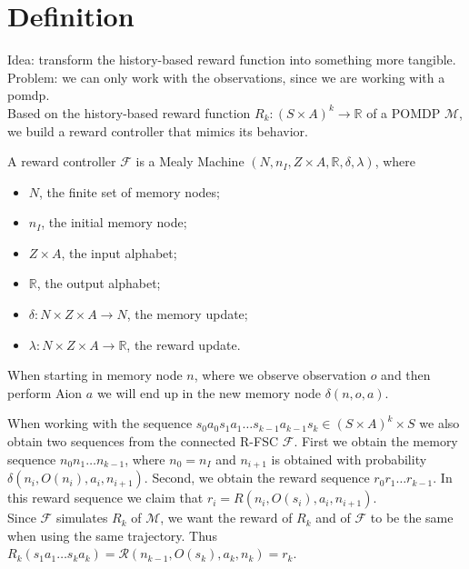 \section{Definition}
Idea: transform the history-based reward function into something more tangible. Problem: we can only work with the observations, since we are working with a pomdp.\\


Based on the history-based reward function $R_k:(S\times A)^k\to\mathbb{R}$ of a POMDP $\mathcal{M}$, we build a reward controller that mimics its behavior.


\begin{definition}
	A reward controller $\mathcal{F}$ is a Mealy Machine $(N,n_I, Z\times A, \mathbb{R}, \delta, \lambda)$, where
	\begin{itemize}
		\item $N$, the finite set of memory nodes;
		\item $n_I$, the initial memory node;
		\item $Z\times A$, the input alphabet;
		\item $\mathbb{R}$, the output alphabet;
		\item $\delta: N \times Z \times A \to N$, the memory update;
		\item $\lambda: N \times Z \times A \to \mathbb{R}$, the reward update. 
	\end{itemize}
\end{definition}


When starting in memory node $n$, where we observe observation $o$ and then perform Aion $a$ we will end up in the new memory node $\delta(n,o,a)$.

When working with the sequence $s_0 a_0 s_1 a_1 \dots s_{k-1} a_{k-1} s_k\in(S\times A)^k\times S$ we also obtain two sequences from the connected R-FSC $\mathcal{F}$. First we obtain the memory sequence $n_0 n_1 \dots n_{k-1}$, where $n_0=n_I$ and $n_{i+1}$ is obtained with probability $\delta(n_i,O(n_i),a_i,n_{i+1})$. Second, we obtain the reward sequence $r_0 r_1 \dots r_{k-1}$. In this reward sequence we claim that $r_i=R(n_i,O(s_i),a_i,n_{i+1})$. \\

Since $\mathcal{F}$ simulates $R_k$ of $\mathcal{M}$, we want the reward of $R_k$ and of $\mathcal{F}$ to be the same when using the same trajectory. Thus $R_k(s_1 a_1 \dots s_{k} a_{k}) = \mathcal{R}(n_{k-1},O(s_{k}),a_{k},n_{k}) = r_{k}$.\\

